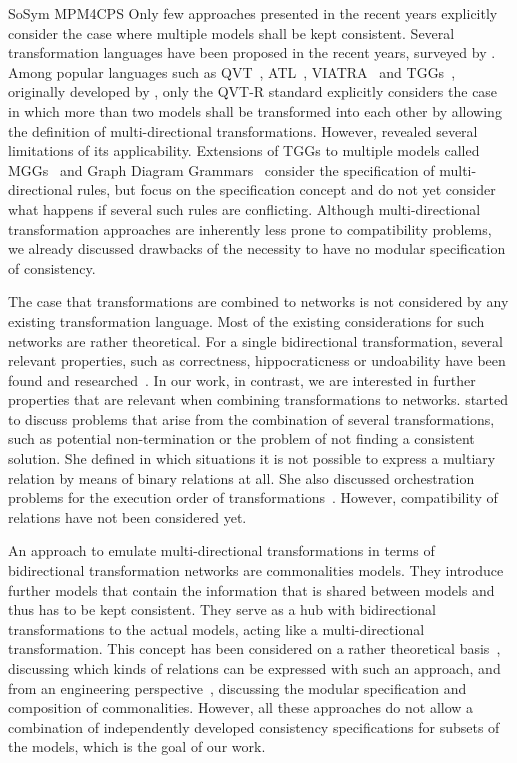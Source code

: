 \begin{copiedFrom}{SoSym MPM4CPS}
Only few approaches presented in the recent years explicitly consider the case where multiple models shall be kept consistent.
Several transformation languages have been proposed in the recent years, surveyed by \textcite{etzlstorfer2013a}.
Among popular languages such as QVT~\cite{qvt}, \ac{ATL}~\cite{jouault2006a,xiong2007a}, VIATRA~\cite{bergmann2015viatra} and \acp{TGG}~\cite{anjorin2014b,anjorin2014c}, originally developed by \textcite{schuerr1995a}, only the QVT-R standard explicitly considers the case in which more than two models shall be transformed into each other by allowing the definition of multi-directional transformations.
However, \textcite{macedo2014a} revealed several limitations of its applicability.
Extensions of \acp{TGG} to multiple models called \acp{MGG}~\cite{konigs2006sosym} and Graph Diagram Grammars~\cite{trollmann2015a, trollmann2016a} consider the specification of multi-directional rules, but focus on the specification concept and do not yet consider what happens if several such rules are conflicting.
Although multi-directional transformation approaches are inherently less prone to compatibility problems, we already discussed drawbacks of the necessity to have no modular specification of consistency.

The case that transformations are combined to networks is not considered by any existing transformation language.
Most of the existing considerations for such networks are rather theoretical.
For a single bidirectional transformation, several relevant properties, such as correctness, hippocraticness or undoability have been found and researched~\cite{stevens2010sosym}.
In our work, in contrast, we are interested in further properties that are relevant when combining transformations to networks.
\textcite{stevens2017a} started to discuss problems that arise from the combination of several transformations, such as potential non-termination or the problem of not finding a consistent solution. She defined in which situations it is not possible to express a multiary relation by means of binary relations at all.
She also discussed orchestration problems for the execution order of transformations~\cite{stevens2018megamodels}.
However, compatibility of relations %
have not been considered yet.

An approach to emulate multi-directional transformations in terms of bidirectional transformation networks are commonalities models. 
They introduce further models that contain the information that is shared between models and thus has to be kept consistent.
They serve as a hub with bidirectional transformations to the actual models, acting like a multi-directional transformation.
This concept has been considered on a rather theoretical basis~\cite{stunkel2018a, diskin2018a}, discussing which kinds of relations can be expressed with such an approach, and from an engineering perspective~\cite{klare2019models}, discussing the modular specification and composition of commonalities.
However, all these approaches do not allow a combination of independently developed consistency specifications for subsets of the models, which is the goal of our work.



\end{copiedFrom}
